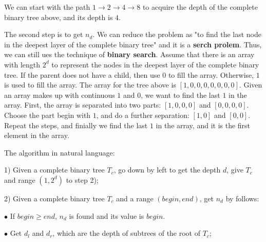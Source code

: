 \documentclass{article}
\begin{document}
    We can start with the path $1\to 2\to 4\to 8$ to acquire the depth of the complete binary tree above, and its depth is $4$.

    The second step is to get $n_{d}$. We can reduce the problem as "to find the last node in the deepest layer of the complete binary tree" and it is a \textbf{serch prolem}. Thus, we can still ues the technique of \textbf{binary search}. Assume that there is an array with length $2^{d}$ to represent the nodes in the deepest layer of the complete binary tree. If the parent does not have a child, then use $0$ to fill the array. Otherwise, $1$ is used to fill the array. The array for the tree above is $[1, 0, 0, 0, 0, 0, 0, 0]$. Given an array makes up with continuous $1$ and $0$, we want to find the last $1$ in the array. First, the array is separated into two parts: $[1, 0, 0, 0]$ and $[0, 0, 0, 0]$. Choose the part begin with $1$, and do a further separation: $[1, 0]$ and $[0, 0]$. Repeat the steps, and finially we find the last $1$ in the array, and it is the first element in the array.



    


    
    The algorithm in natural language:

    1) Given a complete binary tree $T_{c}$, go down by left to get the depth $d$, give $T_{c}$ and range $(1, 2^{d})$ to step 2);

    2) Given a complete binary tree $T_{c}$ and a range $(begin, end)$, get $n_{d}$ by follows:

    $\bullet$ If $begin \ge end$, $n_{d}$ is found and its value is $begin$.

    $\bullet$ Get $d_{l}$ and $d_{r}$, which are the depth of subtrees of the root of $T_{c}$;
\end{document}
